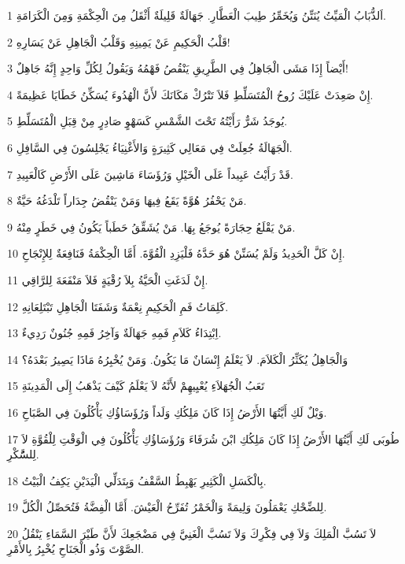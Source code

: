 \par 1 اَلذُّبَابُ الْمَيِّتُ يُنَتِّنُ وَيُخَمِّرُ طِيبَ الْعَطَّارِ. جَهَالَةٌ قَلِيلَةٌ أَثْقَلُ مِنَ الْحِكْمَةِ وَمِنَ الْكَرَامَةِ.
\par 2 قَلْبُ الْحَكِيمِ عَنْ يَمِينِهِ وَقَلْبُ الْجَاهِلِ عَنْ يَسَارِهِ!
\par 3 أَيْضاً إِذَا مَشَى الْجَاهِلُ فِي الطَّرِيقِ يَنْقُصُ فَهْمُهُ وَيَقُولُ لِكُلِّ وَاحِدٍ إِنَّهُ جَاهِلٌ!
\par 4 إِنْ صَعِدَتْ عَلَيْكَ رُوحُ الْمُتَسَلِّطِ فَلاَ تَتْرُكْ مَكَانَكَ لأَنَّ الْهُدُوءَ يُسَكِّنُ خَطَايَا عَظِيمَةً.
\par 5 يُوجَدُ شَرٌّ رَأَيْتُهُ تَحْتَ الشَّمْسِ كَسَهْوٍ صَادِرٍ مِنْ قِبَلِ الْمُتَسَلِّطِ.
\par 6 الْجَهَالَةُ جُعِلَتْ فِي مَعَالِي كَثِيرَةٍ وَالأَغْنِيَاءُ يَجْلِسُونَ فِي السَّافِلِ.
\par 7 قَدْ رَأَيْتُ عَبِيداً عَلَى الْخَيْلِ وَرُؤَسَاءَ مَاشِينَ عَلَى الأَرْضِ كَالْعَبِيدِ.
\par 8 مَنْ يَحْفُرُ هُوَّةً يَقَعُ فِيهَا وَمَنْ يَنْقُضُ جِدَاراً تَلْدَغُهُ حَيَّةٌ.
\par 9 مَنْ يَقْلَعُ حِجَارَةً يُوجَعُ بِهَا. مَنْ يُشَقِّقُ حَطَباً يَكُونُ فِي خَطَرٍ مِنْهُ.
\par 10 إِنْ كَلَّ الْحَدِيدُ وَلَمْ يُسَنِّنْ هُوَ حَدَّهُ فَلْيَزِدِ الْقُوَّةَ. أَمَّا الْحِكْمَةُ فَنَافِعَةٌ لِلإِنْجَاحِ.
\par 11 إِنْ لَدَغَتِ الْحَيَّةُ بِلاَ رُقْيَةٍ فَلاَ مَنْفَعَةَ لِلرَّاقِي.
\par 12 كَلِمَاتُ فَمِ الْحَكِيمِ نِعْمَةٌ وَشَفَتَا الْجَاهِلِ تَبْتَلِعَانِهِ.
\par 13 اِبْتِدَاءُ كَلاَمِ فَمِهِ جَهَالَةٌ وَآخِرُ فَمِهِ جُنُونٌ رَدِيءٌ.
\par 14 وَالْجَاهِلُ يُكَثِّرُ الْكَلاَمَ. لاَ يَعْلَمُ إِنْسَانٌ مَا يَكُونُ. وَمَنْ يُخْبِرُهُ مَاذَا يَصِيرُ بَعْدَهُ؟
\par 15 تَعَبُ الْجُهَلاَءِ يُعْيِيهِمْ لأَنَّهُ لاَ يَعْلَمُ كَيْفَ يَذْهَبُ إِلَى الْمَدِينَةِ
\par 16 وَيْلٌ لَكِ أَيَّتُهَا الأَرْضُ إِذَا كَانَ مَلِكُكِ وَلَداً وَرُؤَسَاؤُكِ يَأْكُلُونَ فِي الصَّبَاحِ.
\par 17 طُوبَى لَكِ أَيَّتُهَا الأَرْضُ إِذَا كَانَ مَلِكُكِ ابْنَ شُرَفَاءَ وَرُؤَسَاؤُكِ يَأْكُلُونَ فِي الْوَقْتِ لِلْقُوَّةِ لاَ لِلسَُّكْرِ.
\par 18 بِالْكَسَلِ الْكَثِيرِ يَهْبِطُ السَّقْفُ وَبِتَدَلِّي الْيَدَيْنِ يَكِفُ الْبَيْتُ.
\par 19 لِلضِّحْكِ يَعْمَلُونَ وَلِيمَةً وَالْخَمْرُ تُفَرِّحُ الْعَيْشَ. أَمَّا الْفِضَّةُ فَتُحَصِّلُ الْكُلَّ.
\par 20 لاَ تَسُبَّ الْمَلِكَ وَلاَ فِي فِكْرِكَ وَلاَ تَسُبَّ الْغَنِيَّ فِي مَضْجَعِكَ لأَنَّ طَيْرَ السَّمَاءِ يَنْقُلُ الصَّوْتَ وَذُو الْجَنَاحِ يُخْبِرُ بِالأَمْرِ.

